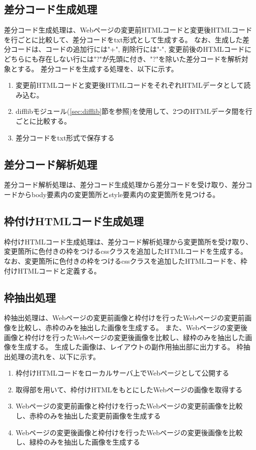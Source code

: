 \subsection{差分コード生成処理}\label{subsec:diff_file_generate}
差分コード生成処理は、Webページの変更前HTMLコードと変更後HTMLコードを行ごとに比較して、差分コードをtxt形式として生成する。
なお、生成した差分コードは、コードの追加行には"+", 削除行には"-", 変更前後のHTMLコードにどちらにも存在しない行には"?"が先頭に付き、"?"を除いた差分コードを解析対象とする。
差分コードを生成する処理を、以下に示す。
\begin{enumerate}
    \item 変更前HTMLコードと変更後HTMLコードをそれぞれHTMLデータとして読み込む。
    \item difflibモジュール(\ref{sec:difflib}節を参照)を使用して、2つのHTMLデータ間を行ごとに比較する。
    \item 差分コードをtxt形式で保存する
\end{enumerate}



\subsection{差分コード解析処理}\label{subsec:diff_file_analyze}
差分コード解析処理は、差分コード生成処理から差分コードを受け取り、差分コードからbody要素内の変更箇所とstyle要素内の変更箇所を見つける。

\subsection{枠付けHTMLコード生成処理}\label{subsec:modified_html_generate}
枠付けHTMLコード生成処理は、差分コード解析処理から変更箇所を受け取り、変更箇所に色付きの枠をつけるcssクラスを追加したHTMLコードを生成する。
なお、変更箇所に色付きの枠をつけるcssクラスを追加したHTMLコードを、枠付けHTMLコードと定義する。

\subsection{枠抽出処理}\label{subsec:frame_extraction}
枠抽出処理は、Webページの変更前画像と枠付けを行ったWebページの変更前画像を比較し、赤枠のみを抽出した画像を生成する。
また、Webページの変更後画像と枠付けを行ったWebページの変更後画像を比較し、緑枠のみを抽出した画像を生成する。
生成した画像は、レイアウトの副作用抽出部に出力する。
枠抽出処理の流れを、以下に示す。
\begin{enumerate}
    \item 枠付けHTMLコードをローカルサーバ上でWebページとして公開する
    \item 取得部を用いて、枠付けHTMLをもとにしたWebページの画像を取得する
    \item Webページの変更前画像と枠付けを行ったWebページの変更前画像を比較し、赤枠のみを抽出した変更前画像を生成する
    \item Webページの変更後画像と枠付けを行ったWebページの変更後画像を比較し、緑枠のみを抽出した画像を生成する
\end{enumerate}

